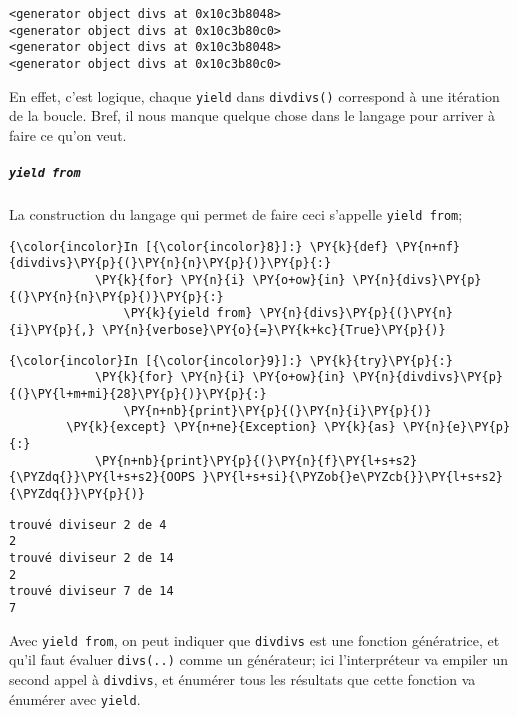     \begin{Verbatim}[commandchars=\\\{\}]
<generator object divs at 0x10c3b8048>
<generator object divs at 0x10c3b80c0>
<generator object divs at 0x10c3b8048>
<generator object divs at 0x10c3b80c0>

    \end{Verbatim}

    En effet, c'est logique, chaque \texttt{yield} dans \texttt{divdivs()}
correspond à une itération de la boucle. Bref, il nous manque quelque
chose dans le langage pour arriver à faire ce qu'on veut.

    \hypertarget{yield-from}{%
\subparagraph{\texorpdfstring{\texttt{yield\ from}}{yield from}}\label{yield-from}}

    La construction du langage qui permet de faire ceci s'appelle
\texttt{yield\ from};

    \begin{Verbatim}[commandchars=\\\{\}]
{\color{incolor}In [{\color{incolor}8}]:} \PY{k}{def} \PY{n+nf}{divdivs}\PY{p}{(}\PY{n}{n}\PY{p}{)}\PY{p}{:}
            \PY{k}{for} \PY{n}{i} \PY{o+ow}{in} \PY{n}{divs}\PY{p}{(}\PY{n}{n}\PY{p}{)}\PY{p}{:}
                \PY{k}{yield from} \PY{n}{divs}\PY{p}{(}\PY{n}{i}\PY{p}{,} \PY{n}{verbose}\PY{o}{=}\PY{k+kc}{True}\PY{p}{)}
\end{Verbatim}


    \begin{Verbatim}[commandchars=\\\{\}]
{\color{incolor}In [{\color{incolor}9}]:} \PY{k}{try}\PY{p}{:}
            \PY{k}{for} \PY{n}{i} \PY{o+ow}{in} \PY{n}{divdivs}\PY{p}{(}\PY{l+m+mi}{28}\PY{p}{)}\PY{p}{:}
                \PY{n+nb}{print}\PY{p}{(}\PY{n}{i}\PY{p}{)}
        \PY{k}{except} \PY{n+ne}{Exception} \PY{k}{as} \PY{n}{e}\PY{p}{:}
            \PY{n+nb}{print}\PY{p}{(}\PY{n}{f}\PY{l+s+s2}{\PYZdq{}}\PY{l+s+s2}{OOPS }\PY{l+s+si}{\PYZob{}e\PYZcb{}}\PY{l+s+s2}{\PYZdq{}}\PY{p}{)}
\end{Verbatim}


    \begin{Verbatim}[commandchars=\\\{\}]
trouvé diviseur 2 de 4
2
trouvé diviseur 2 de 14
2
trouvé diviseur 7 de 14
7

    \end{Verbatim}

    Avec \texttt{yield\ from}, on peut indiquer que \texttt{divdivs} est une
fonction génératrice, et qu'il faut évaluer \texttt{divs(..)} comme un
générateur; ici l'interpréteur va empiler un second appel à
\texttt{divdivs}, et énumérer tous les résultats que cette fonction va
énumérer avec \texttt{yield}.


    
    
    

